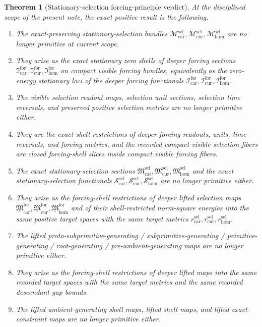 \documentclass[11pt]{article}
\newcommand{\Car}{\mathrm{car}}
\newcommand{\Cur}{\mathrm{cur}}
\newcommand{\Hom}{\mathrm{hom}}
\newcommand{\SelSpace}[1]{\mathcal M_{#1}^{\mathrm{sel}}}
\newcommand{\SelTargetMetric}[1]{r_{#1}^{\mathrm{sel}}}
\newcommand{\SelSection}[1]{\mathfrak M_{#1}^{\mathrm{sel}}}
\newcommand{\SelFunctional}[1]{\mathscr S_{#1}^{\mathrm{sel}}}
\newcommand{\ForSection}[1]{\mathfrak I_{#1}^{\mathrm{for}}}
\newcommand{\ForFunctional}[1]{\mathscr I_{#1}^{\mathrm{for}}}
\newcommand{\ForLiftedSelection}[1]{\underline{\mathfrak M}_{#1}^{\mathrm{for}}}
\newtheorem{theorem}{Theorem}
\begin{document}
\begin{theorem}[Stationary-selection forcing-principle verdict]
\label{thm:verdict}
At the disciplined scope of the present note, the exact positive result is the following.
\begin{enumerate}
    \item The exact-preserving stationary-selection bundles \(\SelSpace{\Car},\SelSpace{\Cur},\SelSpace{\Hom}\) are no longer primitive at current scope.
    \item They arise as the exact stationary zero shells of deeper forcing sections \(\ForSection{\Car},\ForSection{\Cur},\ForSection{\Hom}\) on compact visible forcing bundles, equivalently as the zero-energy stationary loci of the deeper forcing functionals \(\ForFunctional{\Car},\ForFunctional{\Cur},\ForFunctional{\Hom}\).
    \item The visible selection readout maps, selection unit sections, selection time reversals, and preserved positive selection metrics are no longer primitive either.
    \item They are the exact-shell restrictions of deeper forcing readouts, units, time reversals, and forcing metrics, and the recorded compact visible selection fibers are closed forcing-shell slices inside compact visible forcing fibers.
    \item The exact stationary-selection sections \(\SelSection{\Car},\SelSection{\Cur},\SelSection{\Hom}\) and the exact stationary-selection functionals \(\SelFunctional{\Car},\SelFunctional{\Cur},\SelFunctional{\Hom}\) are no longer primitive either.
    \item They arise as the forcing-shell restrictions of deeper lifted selection maps \(\ForLiftedSelection{\Car},\ForLiftedSelection{\Cur},\ForLiftedSelection{\Hom}\) and of their shell-restricted norm-square energies into the same positive target spaces with the same target metrics \(\SelTargetMetric{\Car},\SelTargetMetric{\Cur},\SelTargetMetric{\Hom}\).
    \item The lifted proto-subprimitive-generating / subprimitive-generating / primitive-generating / root-generating / pre-ambient-generating maps are no longer primitive either.
    \item They arise as the forcing-shell restrictions of deeper lifted maps into the same recorded target spaces with the same target metrics and the same recorded descendant gap bounds.
    \item The lifted ambient-generating shell maps, lifted shell maps, and lifted exact-constraint maps are no longer primitive either.

\end{enumerate}
\end{theorem}
\end{document}
